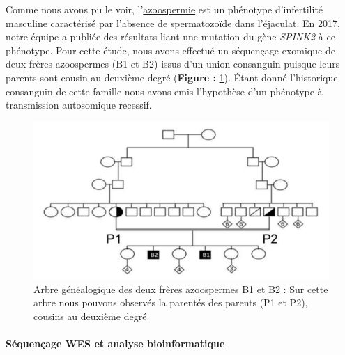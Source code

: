 \documentclass[12pt,twoside]{reedthesis}
\theoremstyle{definition}
\theoremstyle{definition}
\theoremstyle{remark}
\begin{document}
  Comme nous avons pu le voir, l'\protect\hyperlink{infquant}{azoospermie}
  est un phénotype d'infertilité masculine caractérisé par l'absence de
  spermatozoïde dans l'éjaculat. En 2017, notre équipe a publiée des
  résultats liant une mutation du gène \emph{SPINK2} à ce phénotype. Pour
  cette étude, nous avons effectué un séquençage exomique de deux frères
  azoospermes (B1 et B2) issus d'un union consanguin puisque leurs parents
  sont cousin au deuxième degré (\textbf{Figure : }\ref{fig:spink2tree}).
  Étant donné l'historique consanguin de cette famille nous avons emis
  l'hypothèse d'un phénotype à transmission autosomique recessif.
  
  \begin{figure}
  
  {\centering \includegraphics[scale=0.75]{figure/spink2_arbre_genealogique} 
  
  }
  
  \caption[Arbre généalogique des deux frères azoospermes B1 et B2]{Arbre généalogique des deux frères azoospermes B1 et B2 : Sur cette arbre nous pouvons observés la parentés des parents (P1 et P2), cousins au deuxième degré}\label{fig:spink2tree}
  \end{figure}
  
  \paragraph{Séquençage WES et analyse
  bioinformatique}\label{sequencage-wes-et-analyse-bioinformatique}
  
\end{document}
